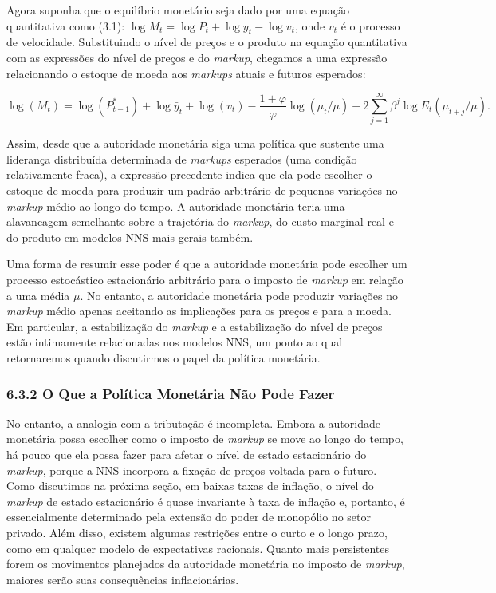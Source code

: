 \documentclass[12pt]{article}
\begin{document}
Agora suponha que o equilíbrio monetário seja dado por uma equação quantitativa como (3.1): $\log M_t = \log P_t + \log y_t - \log v_t$, onde $v_t$ é o processo de velocidade. Substituindo o nível de preços e o produto na equação quantitativa com as expressões do nível de preços e do \textit{markup}, chegamos a uma expressão relacionando o estoque de moeda aos \textit{markups} atuais e futuros esperados:

\begin{equation}
\log (M_t) = \log(P_{t-1}^*) + \log \bar{y}_t + \log (v_t) - \frac{1+\varphi}{\varphi} \log (\mu_t/\mu) - 2 \sum_{j=1}^{\infty} \beta^j \log E_t (\mu_{t+j}/\mu). \tag{6.7}
\end{equation}

Assim, desde que a autoridade monetária siga uma política que sustente uma liderança distribuída determinada de \textit{markups} esperados (uma condição relativamente fraca), a expressão precedente indica que ela pode escolher o estoque de moeda para produzir um padrão arbitrário de pequenas variações no \textit{markup} médio ao longo do tempo. A autoridade monetária teria uma alavancagem semelhante sobre a trajetória do \textit{markup}, do custo marginal real e do produto em modelos NNS mais gerais também.

Uma forma de resumir esse poder é que a autoridade monetária pode escolher um processo estocástico estacionário arbitrário para o imposto de \textit{markup} em relação a uma média $\mu$. No entanto, a autoridade monetária pode produzir variações no \textit{markup} médio apenas aceitando as implicações para os preços e para a moeda. Em particular, a estabilização do \textit{markup} e a estabilização do nível de preços estão intimamente relacionadas nos modelos NNS, um ponto ao qual retornaremos quando discutirmos o papel da política monetária.

\subsubsection{6.3.2 O Que a Política Monetária Não Pode Fazer} No entanto, a analogia com a tributação é incompleta. Embora a autoridade monetária possa escolher como o imposto de \textit{markup} se move ao longo do tempo, há pouco que ela possa fazer para afetar o nível de estado estacionário do \textit{markup}, porque a NNS incorpora a fixação de preços voltada para o futuro. Como discutimos na próxima seção, em baixas taxas de inflação, o nível do \textit{markup} de estado estacionário é quase invariante à taxa de inflação e, portanto, é essencialmente determinado pela extensão do poder de monopólio no setor privado. Além disso, existem algumas restrições entre o curto e o longo prazo, como em qualquer modelo de expectativas racionais. Quanto mais persistentes forem os movimentos planejados da autoridade monetária no imposto de \textit{markup}, maiores serão suas consequências inflacionárias.
\end{document}
